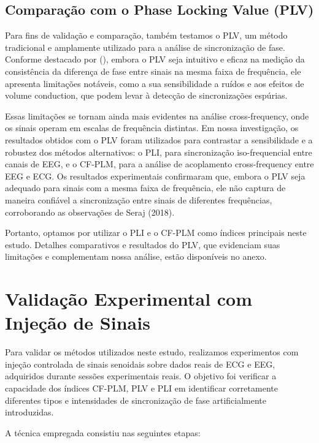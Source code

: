 \subsection{Comparação com o Phase Locking Value (PLV)}

Para fins de validação e comparação, também testamos o PLV, um método tradicional e amplamente utilizado para a análise de sincronização de fase. Conforme destacado por \citeauthor{seraj2018cerebral} (\citeyear{seraj2018cerebral}), embora o PLV seja intuitivo e eficaz na medição da consistência da diferença de fase entre sinais na mesma faixa de frequência, ele apresenta limitações notáveis, como a sua sensibilidade a ruídos e aos efeitos de volume conduction, que podem levar à detecção de sincronizações espúrias.

Essas limitações se tornam ainda mais evidentes na análise cross-frequency, onde os sinais operam em escalas de frequência distintas. Em nossa investigação, os resultados obtidos com o PLV foram utilizados para contrastar a sensibilidade e a robustez dos métodos alternativos: o PLI, para sincronização iso-frequencial entre canais de EEG, e o CF-PLM, para a análise de acoplamento cross-frequency entre EEG e ECG. Os resultados experimentais confirmaram que, embora o PLV seja adequado para sinais com a mesma faixa de frequência, ele não captura de maneira confiável a sincronização entre sinais de diferentes frequências, corroborando as observações de Seraj (2018).

Portanto, optamos por utilizar o PLI e o CF-PLM como índices principais neste estudo. Detalhes comparativos e resultados do PLV, que evidenciam suas limitações e complementam nossa análise, estão disponíveis no anexo.

\section{Validação Experimental com Injeção de Sinais}

Para validar os métodos utilizados neste estudo, realizamos experimentos com injeção controlada de sinais senoidais sobre dados reais de ECG e EEG, adquiridos durante sessões experimentais reais. O objetivo foi verificar a capacidade dos índices CF-PLM, PLV e PLI em identificar corretamente diferentes tipos e intensidades de sincronização de fase artificialmente introduzidas.

A técnica empregada consistiu nas seguintes etapas:

